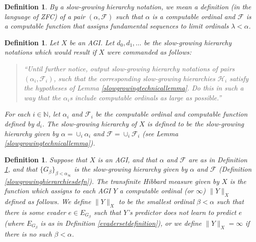\documentclass{article}
\newtheorem{definition}[theorem]{Definition}
\begin{document}
\begin{definition}
    By a \emph{slow-growing hierarchy notation}, we mean a
    definition (in the language of ZFC) of a pair $(\alpha,\mathcal F)$
    such that $\alpha$ is a computable ordinal and $\mathcal F$ is a computable
    function that assigns fundamental sequences to limit ordinals $\lambda<\alpha$.
\end{definition}

\begin{definition}
\label{slowgrowinghierarchyofanagidefn}
    Let $X$ be an AGI.
    Let $d_0,d_1,\ldots$ be the slow-growing hierarchy notations which would result
    if $X$ were commanded as follows:
    \begin{quote}
    ``Until further notice, output slow-growing hierarchy
    notations of pairs $(\alpha_i,\mathcal F_i)$, such that
    the corresponding slow-growing hierarchies $\mathcal H_i$ satisfy
    the hypotheses of Lemma \ref{slowgrowingtechnicallemma}. Do this in such a way
    that the $\alpha_i$s include computable ordinals as large as possible.''
    \end{quote}
    For each $i\in\mathbb N$, let $\alpha_i$ and $\mathcal F_i$ be the
    computable ordinal and computable function defined by $d_i$.
    The \emph{slow-growing hierarchy of $X$} is defined to be
    the slow-growing hierarchy given by $\alpha=\cup_i\alpha_i$
    and $\mathcal F=\cup_i\mathcal F_i$ (see Lemma \ref{slowgrowingtechnicallemma}).
\end{definition}

\begin{definition}
\label{transfinitehibbardmeasuredefn}
    Suppose that $X$ is an AGI, and that
    $\alpha$ and $\mathcal F$ are as in
    Definition \ref{slowgrowinghierarchyofanagidefn}, and that
    $\{G_\beta\}_{\beta<\alpha_\infty}$ is the slow-growing hierarchy
    given by $\alpha$ and $\mathcal F$
    (Definition \ref{slowgrowinghierarchiesdefn}).
    The \emph{transfinite Hibbard measure given by $X$} is
    the function which assigns to each AGI $Y$ a computable ordinal (or $\infty$)
    $\|Y\|_X$
    defined as follows.
    We define $\|Y\|_X$ to be the smallest ordinal $\beta<\alpha$ such that
    there is some evader $e\in E_{G_\beta}$ such that $Y$'s predictor does not
    learn to predict $e$ (where $E_{G_\beta}$ is as in Definition \ref{evadersetdefinition}),
    or we define $\|Y\|_X=\infty$ if there is no such $\beta<\alpha$.
\end{definition}
\end{document}
